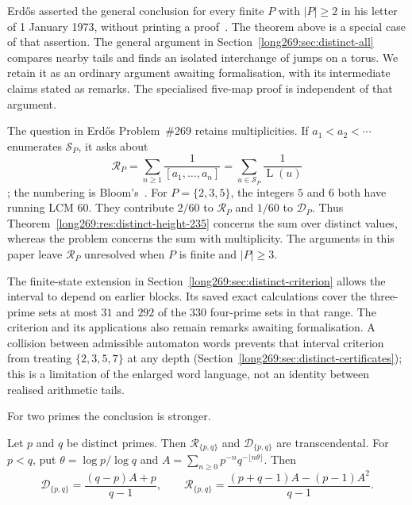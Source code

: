\documentclass[11pt]{article}
\theoremstyle{remark}
\theoremstyle{plain}
\newcommand{\Lprefix}{\operatorname{L}}
\begin{document}
Erd\H{o}s asserted the general conclusion for every finite $P$ with
$|P|\ge2$ in his letter of 1 January 1973, without printing a
proof~\cite[p.~335]{erdos1974letter}. The theorem above is a special case
of that assertion. The general argument in
Section~\ref{long269:sec:distinct-all} compares nearby tails and finds an
isolated interchange of jumps on a torus. We retain it as an ordinary
argument awaiting formalisation, with its intermediate claims stated as
remarks. The specialised five-map proof is independent of that argument.

The question in Erd\H{o}s Problem~\#269 retains multiplicities. If
$a_1<a_2<\cdots$ enumerates $\mathcal S_P$, it asks about
\[
 \mathcal R_P=\sum_{n\ge1}\frac1{[a_1,\ldots,a_n]}
             =\sum_{u\in\mathcal S_P}\frac1{\Lprefix(u)}
\]
\cite[p.~65]{erdosgraham1980}\cite[p.~106]{erdos1988}; the numbering is
Bloom's~\cite{erdosproblems}. For $P=\{2,3,5\}$, the integers $5$ and $6$
both have running LCM $60$. They contribute $2/60$ to $\mathcal R_P$ and
$1/60$ to $\mathcal D_P$. Thus Theorem~\ref{long269:res:distinct-height-235}
concerns the sum over distinct values, whereas the problem concerns
the sum with multiplicity. The arguments in this paper leave
$\mathcal R_P$ unresolved when $P$ is finite and $|P|\ge3$.

The finite-state extension in
Section~\ref{long269:sec:distinct-criterion} allows the interval to depend
on earlier blocks. Its saved exact calculations cover the three-prime
sets at most $31$ and $292$ of the $330$ four-prime sets in that range.
The criterion and its applications also remain remarks awaiting
formalisation. A collision between admissible automaton words prevents
that interval criterion from treating $\{2,3,5,7\}$ at any depth
(Section~\ref{long269:sec:distinct-certificates}); this is a limitation of
the enlarged word language, not an identity between realised arithmetic
tails.

For two primes the conclusion is stronger.

\begin{theorem}\label{long269:res:lead-two-prime}
Let $p$ and $q$ be distinct primes.  Then $\mathcal R_{\{p,q\}}$ and
$\mathcal D_{\{p,q\}}$ are transcendental.
For $p<q$, put $\theta=\log p/\log q$ and
$A=\sum_{n\ge0}p^{-n}q^{-\lfloor n\theta\rfloor}$. Then
\[
 \mathcal D_{\{p,q\}}=\frac{(q-p)A+p}{q-1},\qquad
 \mathcal R_{\{p,q\}}=\frac{(p+q-1)A-(p-1)A^2}{q-1}.
\]
\end{theorem}
\end{document}
